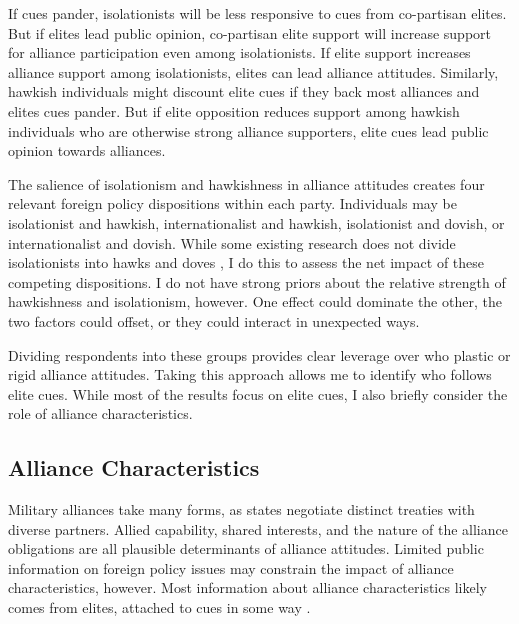 \documentclass[12pt]{article}
\begin{document}
If cues pander, isolationists will be less responsive to cues from co-partisan elites.
But if elites lead public opinion, co-partisan elite support will increase support for alliance participation even among isolationists. 
If elite support increases alliance support among isolationists, elites can lead alliance attitudes. 
Similarly, hawkish individuals might discount elite cues if they back most alliances and elites cues pander. 
But if elite opposition reduces support among hawkish individuals who are otherwise strong alliance supporters, elite cues lead public opinion towards alliances. 


The salience of isolationism and hawkishness in alliance attitudes creates four relevant foreign policy dispositions within each party. 
Individuals may be isolationist and hawkish, internationalist and hawkish, isolationist and dovish, or internationalist and dovish.
While some existing research does not divide isolationists into hawks and doves \citep{Kertzeretal2014}, I do this to assess the net impact of these competing dispositions.   
I do not have strong priors about the relative strength of hawkishness and isolationism, however.
One effect could dominate the other, the two factors could offset, or they could interact in unexpected ways.


Dividing respondents into these groups provides clear leverage over who plastic or rigid alliance attitudes. 
Taking this approach allows me to identify who follows elite cues. 
While most of the results focus on elite cues, I also briefly consider the role of alliance characteristics. 




\subsection{Alliance Characteristics}


Military alliances take many forms, as states negotiate distinct treaties with diverse partners.
Allied capability, shared interests, and the nature of the alliance obligations are all plausible determinants of alliance attitudes.   
Limited public information on foreign policy issues may constrain the impact of alliance characteristics, however. 
Most information about alliance characteristics likely comes from elites, attached to cues in some way \citep{BaumPotter2008}. 
\end{document}
